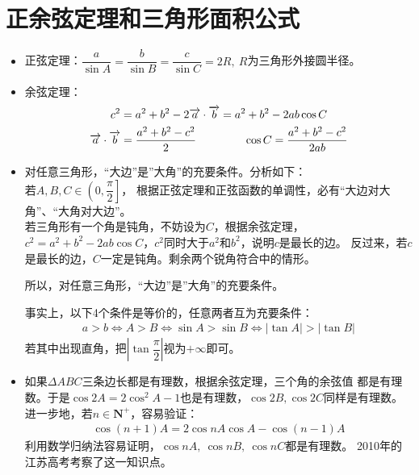 \section{正余弦定理和三角形面积公式}
\begin{itemize}[leftmargin=\inteval{\myitemleftmargin}pt,itemsep=
   \inteval{\myitemitempsep}pt,topsep=\inteval{\myitemtopsep}pt]
\item 正弦定理：$ \dfrac{a}{\sin A}=\dfrac{b}{\sin B}=
\dfrac{c}{\sin C} =2R,\ R $为三角形外接圆半径。

\item 余弦定理：
\begin{gather*}
    c^2=a^2+b^2-2\vec{a}\cdot\vec{b}
    =a^2+b^2-2ab\cos C  \\
    \vec{a}\cdot\vec{b}=\dfrac{a^2+b^2-c^2}{2} 
    \hspace{1.5cm}     \cos C=\dfrac{a^2+b^2-c^2}{2ab}  
\end{gather*}

\item 对任意三角形，“大边”是”大角”的充要条件。分析如下：\\
若$ A,B,C\in\left(0,\dfrac{\pi}{2}\right] $，
根据正弦定理和正弦函数的单调性，必有“大边对大角”、“大角对大边”。\\
若三角形有一个角是钝角，不妨设为$ C $，根据余弦定理，
$ c^2=a^2+b^2-2ab\cos C $，$ c^2 $同时大于$ a^2 $和$ b^2 $，说明$ c $是最长的边。
反过来，若$ c $是最长的边，$ C $一定是钝角。剩余两个锐角符合中的情形。

所以，对任意三角形，“大边”是”大角”的充要条件。

事实上，以下4个条件是等价的，任意两者互为充要条件：
\begin{align*}
    a>b \Leftrightarrow A>B \Leftrightarrow \sin A>\sin B 
     \Leftrightarrow |\tan A|>|\tan B| 
\end{align*}
若其中出现直角，把$ \left|\tan \dfrac{\pi}{2}\right| $视为$ +\infty $即可。

\item 如果$ \Delta ABC $三条边长都是有理数，根据余弦定理，三个角的余弦值
都是有理数。于是$ \cos2A=2\cos^2A-1 $也是有理数，$ \cos2B,\cos2C $同样是有理数。
进一步地，若$ n\in \textbf{N}^+ $，容易验证：
\begin{align*}
    \cos(n+1)A =2\cos nA\cos A -\cos(n-1)A
\end{align*}
利用数学归纳法容易证明，$ \cos nA,\ \cos nB,\ \cos nC $都是有理数。
2010年的江苏高考考察了这一知识点。


\end{itemize}
